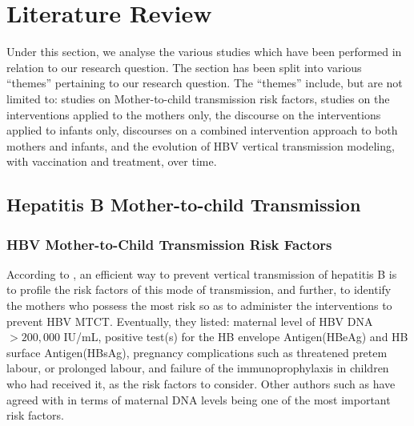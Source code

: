 \chapter{Literature Review}
\label{chp:LIT}
Under this section, we analyse the various studies which have been performed in relation to our research question.  The section has been split into various ``themes'' pertaining to our research question. The ``themes'' include, but are not limited to: studies on Mother-to-child transmission risk factors, studies on the interventions applied to the mothers only, the discourse on the interventions applied to infants only, discourses on a combined intervention approach to both mothers and infants, and the evolution of HBV vertical transmission modeling, with vaccination and treatment, over time.

\section{Hepatitis B Mother-to-child Transmission}
\subsection{HBV Mother-to-Child Transmission Risk Factors}
According to  \cite{Pan2012}, an efficient way to prevent vertical transmission of hepatitis B is to profile the risk factors of this mode of transmission, and further, to identify the mothers who possess the most risk so as to administer the interventions to prevent HBV MTCT. Eventually, they listed: maternal level of HBV DNA $>200,000$ IU/mL, positive test(s) for the HB envelope Antigen(HBeAg) and HB surface Antigen(HBsAg), pregnancy complications such as threatened pretem labour, or prolonged labour, and failure of the immunoprophylaxis in children who had received it, as the risk factors to consider. Other authors such as \cite{wen2013mother} have agreed with \cite{Pan2012} in terms of maternal DNA levels being one of the most important risk factors. 



